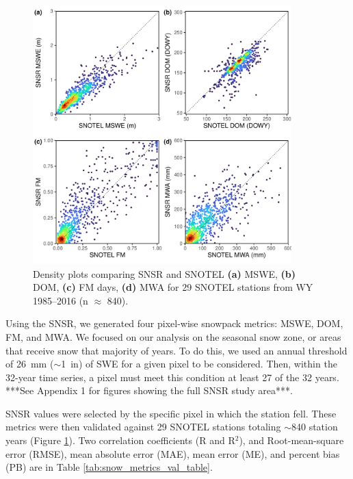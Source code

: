 \begin{figure}[t]
\centering
\includegraphics[width=10cm]{figures/ch2_figs/snsr_snotel_metric_compare_new_v1.pdf}
\caption{Density plots comparing SNSR and SNOTEL \textbf{(a)} MSWE, \textbf{(b)} DOM, \textbf{(c)} FM days, \textbf{(d)} MWA for 29 SNOTEL stations from WY 1985--2016 (n $\approx$ 840).}
\label{kuy_study_area}
\end{figure}

Using the SNSR, we generated four pixel-wise snowpack metrics: MSWE, DOM, FM, and MWA. We focused on our analysis on the seasonal snow zone, or areas that receive snow that majority of years. To do this, we used an annual threshold of 26~mm ($\sim$1~in) of SWE for a given pixel to be considered. Then, within the 32-year time series, a pixel must meet this condition at least 27 of the 32 years. ***See Appendix 1 for figures showing the full SNSR study area***. 

SNSR values were selected by the specific pixel in which the station fell. These metrics were then validated against 29 SNOTEL stations totaling $\sim$840 station years (Figure \ref{kuy_study_area}). Two correlation coefficients (R and R$^{2}$), and Root-mean-square error (RMSE), mean absolute error (MAE), mean error (ME), and percent bias (PB) are in Table \ref{tab:snow_metrics_val_table}.

